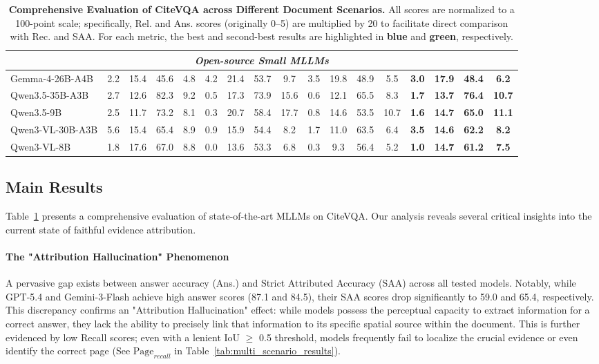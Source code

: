 \documentclass{llmxive}
\providecommand{\highlightgreen}[1]{\colorbox[HTML]{d3ff9f}{\textbf{#1}}}
\providecommand{\highlightblue}[1]{\colorbox[HTML]{bae6fb}{\textbf{#1}}}
\begin{document}
{\begin{table}[t]
\begin{tabular}{@{}l cccc cccc cccc >{\bfseries}c>{\bfseries}c>{\bfseries}c>{\bfseries}c@{}}
\multicolumn{17}{c}{\textit{Open-source Small MLLMs}} \\ \midrule
Gemma-4-26B-A4B &2.2&15.4&45.6&4.8&4.2&21.4&53.7&9.7&3.5&19.8&48.9&5.5&3.0&17.9&48.4&6.2 \\
Qwen3.5-35B-A3B &2.7&12.6&82.3&9.2&0.5&17.3&73.9&15.6&0.6&12.1&65.5&8.3&1.7&13.7&76.4&10.7 \\
Qwen3.5-9B&2.5&11.7&73.2&8.1&0.3&20.7&58.4&17.7&0.8&14.6&53.5&10.7&1.6&14.7&65.0&11.1 \\
Qwen3-VL-30B-A3B &5.6&15.4&65.4&8.9&0.9&15.9&54.4&8.2&1.7&11.0&63.5&6.4&3.5&14.6&62.2&8.2\\
Qwen3-VL-8B &1.8&17.6&67.0&8.8&0.0&13.6&53.3&6.8&0.3&9.3&56.4&5.2&1.0&14.7&61.2&7.5 \\

\bottomrule
\end{tabular}
\caption{\textbf{Comprehensive Evaluation of CiteVQA across Different Document Scenarios.} All scores are normalized to a 100-point scale; specifically, Rel. and Ans. scores (originally 0--5) are multiplied by 20 to facilitate direct comparison with Rec. and SAA. For each metric, the best and second-best results are highlighted in \highlightblue{blue} and \highlightgreen{green}, respectively.}
\label{tab:main_results}
\end{table}


\subsection{Main Results}
Table~\ref{tab:main_results} presents a comprehensive evaluation of state-of-the-art MLLMs on CiteVQA. Our analysis reveals several critical insights into the current state of faithful evidence attribution.

\paragraph{The "Attribution Hallucination" Phenomenon} A pervasive gap exists between answer accuracy (Ans.) and Strict Attributed Accuracy (SAA) across all tested models. Notably, while GPT-5.4 and Gemini-3-Flash achieve high answer scores (87.1 and 84.5), their SAA scores drop significantly to 59.0 and 65.4, respectively. This discrepancy confirms an "Attribution Hallucination" effect: while models possess the perceptual capacity to extract information for a correct answer, they lack the ability to precisely link that information to its specific spatial source within the document. This is further evidenced by low Recall scores; even with a lenient IoU $\ge$ 0.5 threshold, models frequently fail to localize the crucial evidence or even identify the correct page (See $\text{Page}_{recall}$ in Table~\ref{tab:multi_scenario_results}).

}
\end{document}
